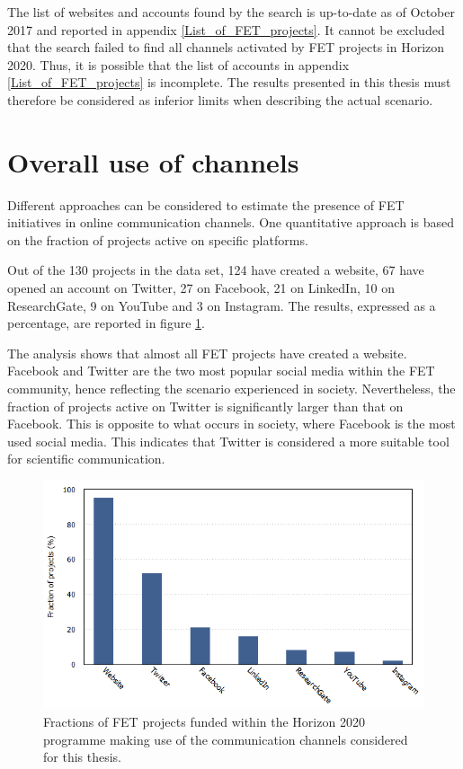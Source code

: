 The list of websites and accounts found by the search is up-to-date as of October 2017 and reported in appendix \ref{List_of_FET_projects}. It cannot be excluded that the search failed to find all channels activated by FET projects in Horizon 2020. Thus, it is possible that the list of accounts in appendix \ref{List_of_FET_projects} is incomplete. The results presented in this thesis must therefore be considered as inferior limits when describing the actual scenario. 

\section{Overall use of channels} \label{Overall_use_of_channels}
Different approaches can be considered to estimate the presence of FET initiatives in online communication channels. One quantitative approach is based on the fraction of projects active on specific platforms.

Out of the 130 projects in the data set, 124 have created a website, 67 have opened an account on Twitter, 27 on Facebook, 21 on LinkedIn, 10 on ResearchGate, 9 on YouTube and 3 on Instagram. The results, expressed as a percentage, are reported in figure \ref{Social_media}.

The analysis shows that almost all FET projects have created a website. Facebook and Twitter are the two most popular social media within the FET community, hence reflecting the scenario experienced in society. Nevertheless, the fraction of projects active on Twitter is significantly larger than that on Facebook. This is opposite to what occurs in society, where Facebook is the most used social media. This indicates that Twitter is considered a more suitable tool for scientific communication. 

\begin{figure}[!t] 
 \begin{center}
 \includegraphics[scale=0.4]{Images/Social_media.png}
 \caption{Fractions of FET projects funded within the Horizon 2020 programme making use of the communication channels considered for this thesis.}
 \label{Social_media}
 \end{center}
\end{figure}

